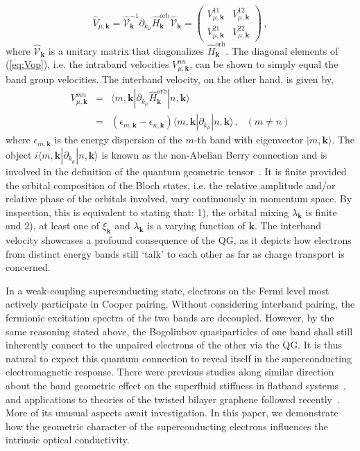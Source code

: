 \documentclass[prl,floatfix,twocolumn,showpacs,amsmath,superscriptaddress]{revtex4-2}
\renewcommand{\vec}[1]{\mathbf{#1}}
\newcommand{\vk}{{\vec{k}}}
\begin{document}
\begin{equation}
	\hat{V}_{\mu,\vk} = \hat{\mathcal{V}}^{-1}_\vk \partial_{k_\mu}\hat{H}^\text{orb}_\vk \hat{\mathcal{V}}_\vk = \begin{pmatrix}
		V_{\mu,\vk}^{11} & V_{\mu,\vk}^{12} \\
		V_{\mu,\vk}^{21} & V_{\mu,\vk}^{22}
	\end{pmatrix} \,,
	\label{eq:Vop}
\end{equation}
where $\hat{\mathcal{V}}_\vk$ is a unitary matrix that diagonalizes $\hat{H}^\text{orb}_\vk$. The diagonal elements of (\ref{eq:Vop}), i.e. the intraband velocities $V^{nn}_{\mu,\vk}$, can be shown to simply equal the band group velocities. The interband velocity, on the other hand, is given by, 
\begin{eqnarray}
	V_{\mu,\vk}^{mn} &=&\langle m,\vk|\partial_{k_\mu} \hat{H}^\text{orb}_\vk|n,\vk \rangle \nonumber \\
	&=&(\epsilon_{m,\vk}-\epsilon_{n,\vk}) \langle m,\vk|\partial_{k_\mu} |n,\vk \rangle\,,~~~(m\neq n)
\end{eqnarray}
where $\epsilon_{m,\vk}$ is the energy dispersion of the $m$-th band with eigenvector $|m,\vk \rangle$. The object $i\langle m,\vk|\partial_{k_\mu} |n,\vk \rangle$ is known as the non-Abelian Berry connection and is involved in the definition of the quantum geometric tensor~\cite{Provost:80,Liang:17,Iskin:19,Li:20,Topp:21,Ahn:21}. It is finite provided the orbital composition of the Bloch states, i.e. the relative amplitude and/or relative phase of the orbitals involved, vary continuously in momentum space. By inspection, this is equivalent to stating that: 1), the orbital mixing $\lambda_\vk$ is finite and 2), at least one of $\xi_{\vk}$ and $\lambda_\vk$ is a varying function of $\vk$. The interband velocity showcases a profound consequence of the QG, as it depicts how electrons from distinct energy bands still `talk' to each other as far as charge transport is concerned. 

In a weak-coupling superconducting state, electrons on the Fermi level most actively participate in Cooper pairing. Without considering interband pairing, the fermionic excitation spectra of the two bands are decoupled. However, by the same reasoning stated above, the Bogoliubov quasiparticles of one band shall still inherently connect to the unpaired electrons of the other via the QG. It is thus natural to expect this quantum connection to reveal itself in the superconducting electromagnetic response. There were previous studies along similar direction about the band geometric effect on the superfluid stiffness in flatband systems~\cite{Peotta:15,Julku:16,Liang:17}, and applications to theories of the twisted bilayer graphene followed recently~\cite{Hu:19,Julku:20,Xie:20,Hazra:19,Verma:21}. More of its unusual aspects await investigation. In this paper, we demonstrate how the geometric character of the superconducting electrons influences the intrinsic optical conductivity. 
\end{document}
